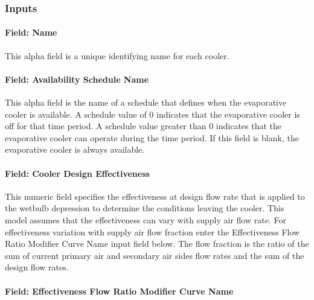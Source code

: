 \subsubsection{Inputs}\label{inputs-1-014}

\paragraph{Field: Name}\label{field-name-1-013}

This alpha field is a unique identifying name for each cooler.

\paragraph{Field: Availability Schedule Name}\label{field-availability-schedule-name-006}

This alpha field is the name of a schedule that defines when the evaporative cooler is available. A schedule value of 0 indicates that the evaporative cooler is off for that time period. A schedule value greater than 0 indicates that the evaporative cooler can operate during the time period. If this field is blank, the evaporative cooler is always available.

\paragraph{Field: Cooler Design Effectiveness}\label{field-cooler-design-effectiveness}

This numeric field specifies the effectiveness at design flow rate that is applied to the wetbulb depression to determine the conditions leaving the cooler. This model assumes that the effectiveness can vary with supply air flow rate. For effectiveness variation with supply air flow fraction enter the Effectiveness Flow Ratio Modifier Curve Name input field below. The flow fraction is the ratio of the sum of current primary air and secondary air sides flow rates and the sum of the design flow rates.

\paragraph{Field: Effectiveness Flow Ratio Modifier Curve Name}\label{field-effectiveness-flow-ratio-modifier-curve-name}

